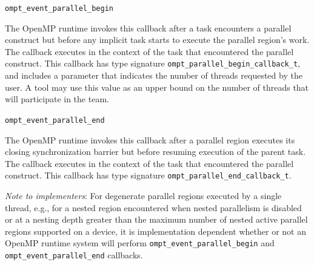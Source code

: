 \documentclass{article}
\newcommand{\descheader}[1]{{\needspace{3\baselineskip}\vspace{1em}\noindent \fbox{#1}}}
\begin{document}
\descheader{Parallel Regions}

\begin{description}

\item \verb|ompt_event_parallel_begin|

\sloppy
The OpenMP runtime invokes this callback 
after a task encounters a parallel construct
but before any implicit task starts to execute the
parallel region's work. The callback executes in the context of the task that encountered the parallel construct.
This callback has type signature \verb|ompt_parallel_begin_callback_t|, and includes a parameter that indicates the number of threads requested by the user. 
A tool may use this value as an upper bound on the number of threads that will participate in the team.



\item \verb|ompt_event_parallel_end|

The OpenMP runtime invokes this callback 
after a parallel
region executes its closing synchronization barrier but before
resuming execution of the parent task.  The callback executes in
the context of the task that encountered the parallel construct.
This callback has type signature \verb|ompt_parallel_end_callback_t|. 

\end{description}

\noindent
{\em Note to implementers}: For degenerate parallel regions executed by a single thread, e.g., for
a nested region encountered when nested parallelism is disabled or at a nesting depth greater than the 
maximum number of nested active parallel regions supported on a device, 
it is implementation dependent whether or not an OpenMP runtime system will perform
 \verb|ompt_event_parallel_begin| and \verb|ompt_event_parallel_end| callbacks.


% 
% 
% 
% 
% 
%   
\end{document}
